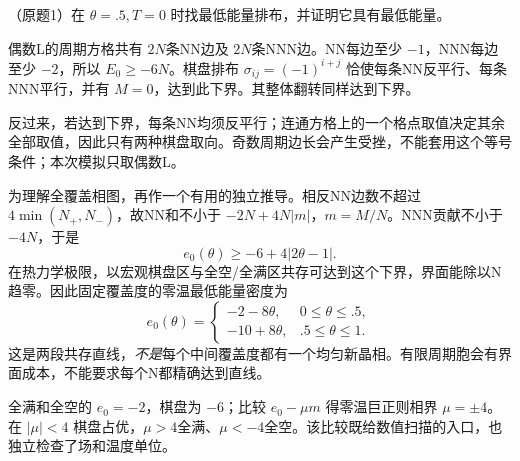 \begin{exercise}\label{task:lab5-1}
（原题1）在 $\theta=.5,T=0$ 时找最低能量排布，并证明它具有最低能量。
\end{exercise}
\begin{solution}
偶数L的周期方格共有 $2N$条NN边及 $2N$条NNN边。NN每边至少 $-1$，NNN每边至少 $-2$，所以 $E_0\ge-6N$。棋盘排布 $\sigma_{ij}=(-1)^{i+j}$ 恰使每条NN反平行、每条NNN平行，并有 $M=0$，达到此下界。其整体翻转同样达到下界。

反过来，若达到下界，每条NN均须反平行；连通方格上的一个格点取值决定其余全部取值，因此只有两种棋盘取向。奇数周期边长会产生受挫，不能套用这个等号条件；本次模拟只取偶数L。

为理解全覆盖相图，再作一个有用的独立推导。相反NN边数不超过 $4\min(N_+,N_-)$，故NN和不小于 $-2N+4N|m|$，$m=M/N$。NNN贡献不小于 $-4N$，于是
\[
 e_0(\theta)\ge-6+4|2\theta-1|.
\]
在热力学极限，以宏观棋盘区与全空/全满区共存可达到这个下界，界面能除以N趋零。因此固定覆盖度的零温最低能量密度为
\[
 e_0(\theta)=
 \begin{cases}-2-8\theta,&0\le\theta\le.5,\\
               -10+8\theta,&.5\le\theta\le1.
 \end{cases}
\]
这是两段共存直线，\emph{不是}每个中间覆盖度都有一个均匀新晶相。有限周期胞会有界面成本，不能要求每个N都精确达到直线。

全满和全空的 $e_0=-2$，棋盘为 $-6$；比较 $e_0-\mu m$ 得零温巨正则相界 $\mu=\pm4$。在 $|\mu|<4$ 棋盘占优，$\mu>4$全满、$\mu<-4$全空。该比较既给数值扫描的入口，也独立检查了场和温度单位。
\end{solution}

